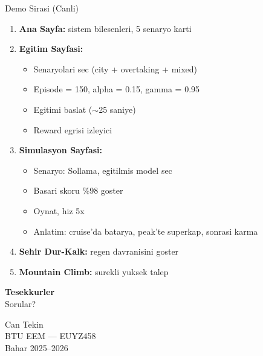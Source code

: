 \documentclass[10pt,aspectratio=169]{beamer}
\begin{document}
\begin{frame}{Demo Sirasi (Canli)}
\begin{enumerate}
  \item \textbf{Ana Sayfa:} sistem bilesenleri, 5 senaryo karti
  \item \textbf{Egitim Sayfasi:}
    \begin{itemize}\footnotesize
      \item Senaryolari sec (city + overtaking + mixed)
      \item Episode = 150, alpha = 0.15, gamma = 0.95
      \item Egitimi baslat ($\sim$25 saniye)
      \item Reward egrisi izleyici
    \end{itemize}
  \item \textbf{Simulasyon Sayfasi:}
    \begin{itemize}\footnotesize
      \item Senaryo: Sollama, egitilmis model sec
      \item Basari skoru \%98 goster
      \item Oynat, hiz 5x
      \item Anlatim: cruise'da batarya, peak'te superkap, sonrasi karma
    \end{itemize}
  \item \textbf{Sehir Dur-Kalk:} regen davranisini goster
  \item \textbf{Mountain Climb:} surekli yuksek talep
\end{enumerate}
\end{frame}

\begin{frame}
\vfill
\begin{center}
{\Huge \textbf{Tesekkurler}}\\[1em]
{\large Sorular?}
\end{center}
\vfill

\begin{flushright}\small
Can Tekin\\
BTU EEM --- EUYZ458\\
Bahar 2025--2026
\end{flushright}
\end{frame}
\end{document}
